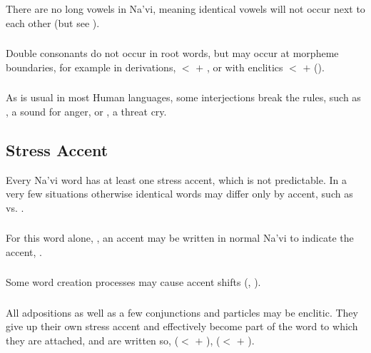 \subsubsection{} There are no long vowels in Na'vi, meaning identical
vowels will not occur next to each other (but see
).

\subsubsection{} Double consonants do not occur in root words, but
may occur at morpheme boundaries, for example in derivations,
 $<$  $+$ , or with enclitics
 $<$  $+$  ().

\subsubsection{} As is usual in most Human languages, some
interjections break the rules, such as , a sound for anger, or
, a threat cry.


\subsection{Stress Accent}
Every Na'vi word has at least one stress accent, which is not
predictable.  In a very few situations otherwise identical words may
differ only by accent, such as  
vs.  .

\subsubsection{} For this word alone, , an accent may be
written in normal Na'vi to indicate the accent, .

\subsubsection{} Some word creation processes may cause accent shifts
(, ).

\subsubsection{} All adpositions as well as a few conjunctions and
particles may be enclitic.  They give up their own stress accent and
effectively become part of the word to which they are attached, and
are written so,  ($<$  $+$ ),
 ($<$  $+$ ).
\label{l-and-s:stress:enclisis}

